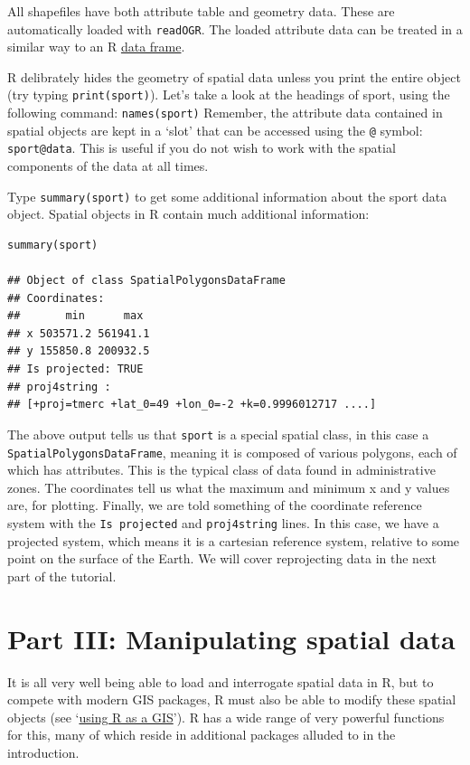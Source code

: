 \documentclass[]{article}
\begin{document}
All shapefiles have both attribute table and geometry data. These are
automatically loaded with \texttt{readOGR}. The loaded attribute data
can be treated in a similar way to an R
\href{http://www.statmethods.net/input/datatypes.html}{data frame}.

R delibrately hides the geometry of spatial data unless you print the
entire object (try typing \texttt{print(sport)}). Let's take a look at
the headings of sport, using the following command:
\texttt{names(sport)} Remember, the attribute data contained in spatial
objects are kept in a `slot' that can be accessed using the \texttt{@}
symbol: \texttt{sport@data}. This is useful if you do not wish to work
with the spatial components of the data at all times.

Type \texttt{summary(sport)} to get some additional information about
the sport data object. Spatial objects in R contain much additional
information:

\begin{verbatim}
summary(sport)

## Object of class SpatialPolygonsDataFrame
## Coordinates:
##       min      max
## x 503571.2 561941.1
## y 155850.8 200932.5
## Is projected: TRUE 
## proj4string :
## [+proj=tmerc +lat_0=49 +lon_0=-2 +k=0.9996012717 ....]
\end{verbatim}

The above output tells us that \texttt{sport} is a special spatial
class, in this case a \texttt{SpatialPolygonsDataFrame}, meaning it is
composed of various polygons, each of which has attributes. This is the
typical class of data found in administrative zones. The coordinates
tell us what the maximum and minimum x and y values are, for plotting.
Finally, we are told something of the coordinate reference system with
the \texttt{Is projected} and \texttt{proj4string} lines. In this case,
we have a projected system, which means it is a cartesian reference
system, relative to some point on the surface of the Earth. We will
cover reprojecting data in the next part of the tutorial.

\section{Part III: Manipulating spatial
data}\label{part-iii-manipulating-spatial-data}

It is all very well being able to load and interrogate spatial data in
R, but to compete with modern GIS packages, R must also be able to
modify these spatial objects (see
`\href{https://github.com/Pakillo/R-GIS-tutorial}{using R as a GIS}'). R
has a wide range of very powerful functions for this, many of which
reside in additional packages alluded to in the introduction.
\end{document}
